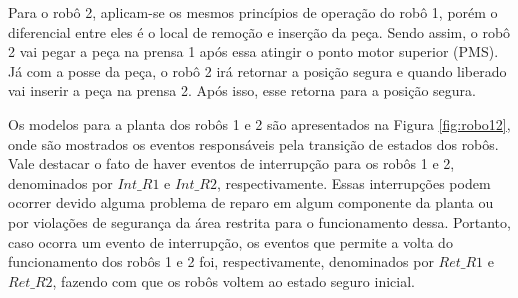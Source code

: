 Para o robô 2, aplicam-se os mesmos princípios de operação do robô 1, porém o diferencial entre eles é o local de remoção e inserção da peça. Sendo assim, o robô 2 vai pegar a peça na prensa 1 após essa atingir o ponto motor superior (PMS). Já com a posse da peça, o robô 2 irá retornar a posição segura e quando liberado vai inserir a peça na prensa 2. Após isso, esse retorna para a posição segura.

Os modelos para a planta dos robôs 1 e 2 são apresentados na Figura \ref{fig:robo12}, onde são mostrados os eventos responsáveis pela transição de estados dos robôs. Vale destacar o fato de haver eventos de interrupção para os robôs 1 e 2, denominados por $Int\_R1$ e $Int\_R2$, respectivamente. Essas interrupções podem ocorrer devido alguma problema de reparo em algum componente da planta ou por violações de segurança da área restrita para o funcionamento dessa. Portanto, caso ocorra um evento de interrupção, os eventos que permite a volta do funcionamento dos robôs 1 e 2 foi, respectivamente, denominados por $Ret\_R1$ e $Ret\_R2$, fazendo com que os robôs voltem ao estado seguro inicial.

